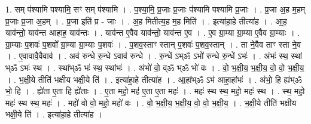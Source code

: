 \documentclass[17pt]{extarticle}
\begin{document}
1. सम् प॑श्यामि पश्यामि॒ सꣳ सम् प॑श्यामि । . प॒श्या॒मि॒ प्र॒जाः प्र॒जाः प॑श्यामि पश्यामि प्र॒जाः । . प्र॒जा अ॒ह म॒हम् प्र॒जाः प्र॒जा अ॒हम् । . प्र॒जा इति॑ प्र - जाः । . अ॒ह मितीत्य॒ह म॒ह मिति॑ । . इत्या॑हा॒हे तीत्या॑ह । . आ॒ह॒ याव॑न्तो॒ याव॑न्त आहाह॒ याव॑न्तः । . याव॑न्त ए॒वैव याव॑न्तो॒ याव॑न्त ए॒व । . ए॒व ग्रा॒म्या ग्रा॒म्या ए॒वैव ग्रा॒म्याः । . ग्रा॒म्याः प॒शवः॑ प॒शवो᳚ ग्रा॒म्या ग्रा॒म्याः प॒शवः॑ । . प॒शव॒स्ताꣳ स्तान् प॒शवः॑ प॒शव॒स्तान् । . ता ने॒वैव ताꣳ स्ता ने॒व । . ए॒वावावै॒वैवाव॑ । . अव॑ रुन्धे रु॒न्धे ऽवाव॑ रुन्धे । . रु॒न्धें ऽभ्ॐ ऽभो॑ रुन्धे रु॒न्धें ऽभः॑ । . अंभः॑ स्थ॒ स्थां भ्ॐ ऽभः॑ स्थ । . स्थांभ्ॐ भः॑ स्थ॒ स्थांभः॑ । . अंभो॑ वो॒ व्ॐ भ्ॐ भो॑ वः । . वो॒ भ॒क्षी॒य॒ भ॒क्षी॒य॒ वो॒ वो॒ भ॒क्षी॒य॒ । . भ॒क्षी॒ये तीति॑ भक्षीय भक्षी॒ये ति॑ । . इत्या॑हा॒हे तीत्या॑ह । . आ॒हांभ्ॐ ऽभ॑ आहा॒हांभः॑ । . अंभो॒ हि ह्यंभ्ॐ भो॒ हि । . ह्ये॑ता ए॒ता हि ह्ये॑ताः । . ए॒ता महो॒ मह॑ ए॒ता ए॒ता महः॑ । . महः॑ स्थ स्थ॒ महो॒ महः॑ स्थ । . स्थ॒ महो॒ महः॑ स्थ स्थ॒ महः॑ । . महो॑ वो वो॒ महो॒ महो॑ वः । . वो॒ भ॒क्षी॒य॒ भ॒क्षी॒य॒ वो॒ वो॒ भ॒क्षी॒य॒ । . भ॒क्षी॒ये तीति॑ भक्षीय भक्षी॒ये ति॑ । . इत्या॑हा॒हे तीत्या॑ह । \newline
\end{document}

